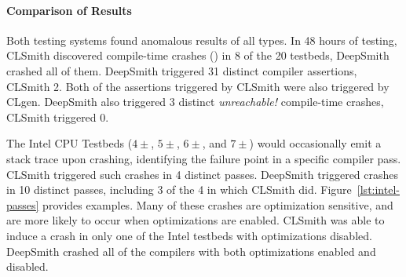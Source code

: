



\paragraph{Comparison of Results} %
Both testing systems found anomalous results of all types.
%
In 48 hours of testing, CLSmith discovered compile-time crashes (\bc) in 8 of the 20 testbeds, DeepSmith crashed all of them. DeepSmith triggered 31 distinct compiler assertions, CLSmith 2. Both of the assertions triggered by CLSmith were also triggered by CLgen. DeepSmith also triggered 3 distinct \emph{unreachable!} compile-time crashes, CLSmith triggered 0.

The Intel CPU Testbeds ($4\pm$, $5\pm$, $6\pm$, and $7\pm$) would occasionally emit a stack trace upon crashing, identifying the failure point in a specific compiler pass. CLSmith triggered such crashes in 4 distinct passes. DeepSmith triggered crashes in 10 distinct passes, including 3 of the 4 in which CLSmith did. Figure~\ref{lst:intel-passes} provides examples. Many of these crashes are optimization sensitive, and are more likely to occur when optimizations are enabled. CLSmith was able to induce a crash in only one of the Intel testbeds with optimizations disabled. DeepSmith crashed all of the compilers with both optimizations enabled and disabled.


%

